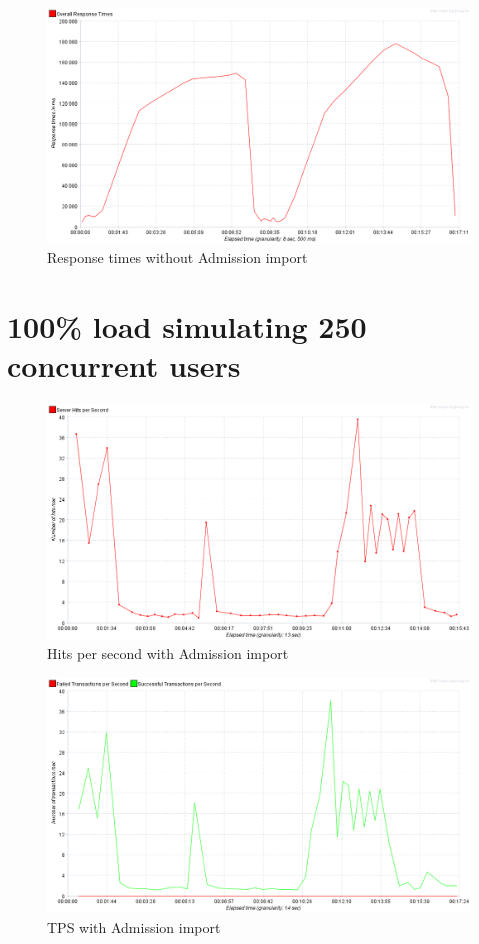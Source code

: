 	\begin{figure}[h]
		\label{fig:jmeter:response_times_over_time_125_without_admission_import}
		\centering
		\includegraphics[width=12cm]{figures/jmeter/response_times_over_time_125_without_admission_import}
		\caption{Response times without Admission import}
	\end{figure}

	\section{100\% load simulating 250 concurrent users}	

	\begin{figure}[h]
		\label{fig:jmeter:hits_per_second_250_with_admission_import}
		\centering
		\includegraphics[width=12cm]{figures/jmeter/hits_per_second_250_with_admission_import}
		\caption{Hits per second with Admission import}
	\end{figure}

	\begin{figure}[h]
		\label{fig:jmeter:tps_250_with_admission_import}
		\centering
		\includegraphics[width=12cm]{figures/jmeter/tps_250_with_admission_import}
		\caption{TPS with Admission import}
	\end{figure}

